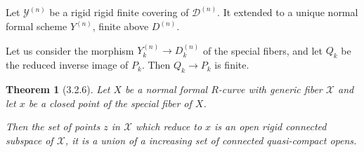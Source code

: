 \documentclass[oneside,12pt,]{article}
\newtheorem{theorem}{Theorem}
\begin{document}
\begin{figure}[H]
    \centering
    \end{figure}

Let $\mathscr Y^{(n)}$ be a rigid rigid finite covering of $\mathscr D^{(n)}$. It extended to a unique normal formal scheme $Y^{(n)}$, finite above $D^{(n)}$.

Let us consider the morphism $Y^{(n)}_k \to D^{(n)}_k$ of the special fibers, and let $Q_k$ be the  reduced inverse image of $P_k$. Then $Q_k\to  P_k$ is finite.



\begin{theorem}[3.2.6]
    Let $X$ be a normal formal $R$-curve with generic fiber $\mathscr X$ and let $x$ be a closed point of the special fiber of $X$.

    Then the set of points $z$ in $\mathscr X$ which reduce to $x $ is an open rigid connected subspace of $\mathscr X$, it is a union of a increasing set of connected quasi-compact opens.
\end{theorem}
\end{document}
